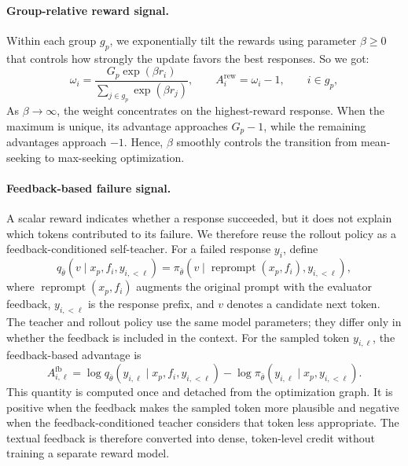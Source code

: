 \documentclass{article} %
\begin{document}
\paragraph{Group-relative reward signal.}
Within each group $g_p$, we exponentially tilt the rewards using parameter $\beta\geq 0$ that controls how strongly the update favors the best responses. So we got:
\begin{equation}
\omega_i
=
\frac{
G_p \exp(\beta r_i)
}{
\displaystyle\sum_{j\in g_p}\exp(\beta r_j)
},
\qquad
A_i^{\mathrm{rew}}
=
\omega_i-1,
\qquad i\in g_p,
\label{eq:reward-advantage}
\end{equation}
As $\beta\rightarrow\infty$, the weight concentrates
on the highest-reward response. When the maximum is unique, its advantage
approaches $G_p-1$, while the remaining advantages approach $-1$. Hence,
$\beta$ smoothly controls the transition from mean-seeking to max-seeking
optimization.

\paragraph{Feedback-based failure signal.}
A scalar reward indicates whether a response succeeded, but it does not explain
which tokens contributed to its failure. We therefore reuse the rollout policy
as a feedback-conditioned self-teacher.
For a failed response $y_i$, define
\begin{equation*}
q_{\bar{\theta}}
\left(
v
\mid
x_p,f_i,y_{i,<\ell}
\right)
=
\pi_{\bar{\theta}}
\left(
v
\mid
\operatorname{reprompt}(x_p,f_i),y_{i,<\ell}
\right),
\label{eq:self-teacher}
\end{equation*}
where $\operatorname{reprompt}(x_p,f_i)$ augments the original prompt with the
evaluator feedback, $y_{i,<\ell}$ is the response prefix, and $v$ denotes a
candidate next token. The teacher and rollout policy use the same model
parameters; they differ only in whether the feedback is included in the
context.
For the sampled token $y_{i,\ell}$, the feedback-based advantage is
\begin{equation}
A_{i,\ell}^{\mathrm{fb}}
=
\log
q_{\bar{\theta}}
\left(
y_{i,\ell}
\mid
x_p,f_i,y_{i,<\ell}
\right)
-
\log
\pi_{\bar{\theta}}
\left(
y_{i,\ell}
\mid
x_p,y_{i,<\ell}
\right).
\label{eq:feedback-advantage}
\end{equation}
This quantity is computed once and detached from the optimization graph.
It is positive when the feedback makes the sampled token more plausible and
negative when the feedback-conditioned teacher considers that token less
appropriate. The textual feedback is therefore converted into dense,
token-level credit without training a separate reward model.
\end{document}
